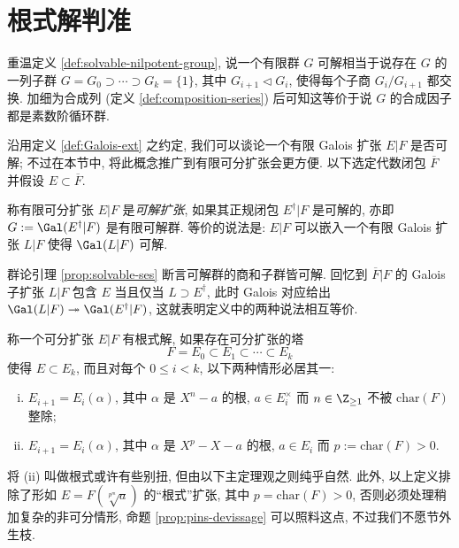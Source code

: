 \section{根式解判准}\label{sec:solvability-radicals}
重温定义 \ref{def:solvable-nilpotent-group}, 说一个有限群 $G$ 可解相当于说存在 $G$ 的一列子群 $G = G_0 \supset \cdots \supset G_k = \{1\}$, 其中 $G_{i+1} \lhd G_i$, 使得每个子商 $G_i/G_{i+1}$ 都交换. 加细为合成列 (定义 \ref{def:composition-series}) 后可知这等价于说 $G$ 的合成因子都是素数阶循环群.

沿用定义 \ref{def:Galois-ext} 之约定, 我们可以谈论一个有限 Galois 扩张 $E|F$ 是否可解; 不过在本节中, 将此概念推广到有限可分扩张会更方便. 以下选定代数闭包 $\overline{F}$ 并假设 $E \subset \overline{F}$.

\begin{definition}
	称有限可分扩张 $E|F$ 是\emph{可解扩张}, 如果其正规闭包 $E^\dagger|F$ 是可解的, 亦即 $G := \Gal(E^\dagger|F)$ 是有限可解群. 等价的说法是: $E|F$ 可以嵌入一个有限 Galois 扩张 $L|F$ 使得 $\Gal(L|F)$ 可解.
\end{definition}
群论引理 \ref{prop:solvable-ses} 断言可解群的商和子群皆可解. 回忆到 $\overline{F}|F$ 的 Galois 子扩张 $L|F$ 包含 $E$ 当且仅当 $L \supset E^\dagger$, 此时 Galois 对应给出 $\Gal(L|F) \twoheadrightarrow \Gal(E^\dagger|F)$, 这就表明定义中的两种说法相互等价.

\begin{definition}\label{def:radical-ext}
	称一个可分扩张 $E|F$ 有根式解, 如果存在可分扩张的塔
	\[ F = E_0 \subset E_1 \subset \cdots \subset E_k \]
	使得 $E \subset E_k$, 而且对每个 $0 \leq i < k$, 以下两种情形必居其一:
	\begin{enumerate}[(i)]
		\item $E_{i+1} = E_i(\alpha)$, 其中 $\alpha$ 是 $X^n - a$ 的根, $a \in E_i^\times$ 而 $n \in \Z_{\geq 1}$ 不被 $\text{char}(F)$ 整除;
		\item $E_{i+1} = E_i(\alpha)$, 其中 $\alpha$ 是 $X^p- X - a$ 的根, $a \in E_i$ 而 $p := \text{char}(F) > 0$.
	\end{enumerate}
\end{definition}
将 (ii) 叫做根式或许有些别扭, 但由以下主定理观之则纯乎自然. 此外, 以上定义排除了形如 $E = F(\sqrt[p^m]{a})$ 的``根式''扩张, 其中 $p = \text{char}(F) > 0$, 否则必须处理稍加复杂的非可分情形, 命题 \ref{prop:pins-devissage} 可以照料这点, 不过我们不愿节外生枝.

